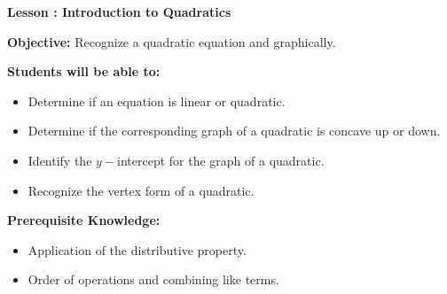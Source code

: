 \documentclass[12pt]{article}
\theoremstyle{definition}
\begin{document}
{\bf \large Lesson : Introduction to Quadratics}\label{les:quadratics_introduction}
\hfill \doclicenseImage[imagewidth=5em]\\
\par
{\bf Objective:} Recognize a quadratic equation and graphically.\\
\par
{\bf Students will be able to:}
\begin{itemize}
	\item Determine if an equation is linear or quadratic.
	\item Determine if the corresponding graph of a quadratic is concave up or down.
	\item Identify the $y-$intercept for the graph of a quadratic.
	\item Recognize the vertex form of a quadratic.
\end{itemize}
{\bf Prerequisite Knowledge:}
\begin{itemize}
	\item Application of the distributive property.
	\item Order of operations and combining like terms.
\end{itemize}
\hrulefill
\end{document}
